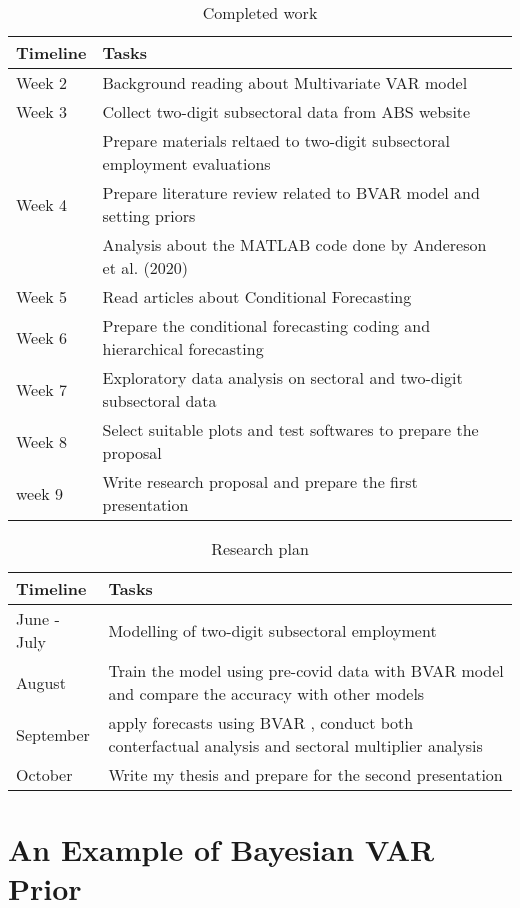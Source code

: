 \documentclass{monashthesis}
\begin{document}
\begin{table}

\caption{\label{tab:timeline1}Completed work}
\centering
\begin{tabular}[t]{ll}
\toprule
Timeline & Tasks\\
\midrule
Week 2 & Background reading about Multivariate VAR model\\
Week 3 & Collect two-digit subsectoral data from ABS website\\
 & Prepare materials reltaed to two-digit subsectoral employment evaluations\\
Week 4 & Prepare literature review related to BVAR model and setting priors\\
 & Analysis about the MATLAB code done by Andereson et al. (2020)\\
\addlinespace
Week 5 & Read articles about Conditional Forecasting\\
Week 6 & Prepare the conditional forecasting coding and hierarchical forecasting\\
Week 7 & Exploratory data analysis on sectoral and two-digit subsectoral data\\
Week 8 & Select suitable plots and test softwares to prepare the proposal\\
week 9 & Write research proposal and prepare the first presentation\\
\bottomrule
\end{tabular}
\end{table}

\begin{table}

\caption{\label{tab:timeline2}Research plan}
\centering
\begin{tabular}[t]{ll}
\toprule
Timeline & Tasks\\
\midrule
June - July & Modelling of two-digit subsectoral employment\\
August & Train the model using pre-covid data with BVAR model and compare the accuracy with other models\\
September & apply forecasts using BVAR , conduct both conterfactual analysis and sectoral multiplier analysis\\
October & Write my thesis and prepare for the second presentation\\
\bottomrule
\end{tabular}
\end{table}

\appendix

\hypertarget{an-example-of-bayesian-var-prior}{%
\chapter{An Example of Bayesian VAR Prior}\label{an-example-of-bayesian-var-prior}}
\end{document}
